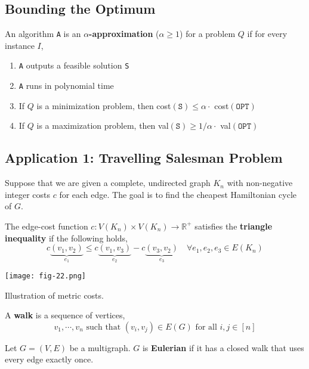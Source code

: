 \subsection{Bounding the Optimum}

\begin{defn}
	An algorithm \texttt{A} is an \textbf{$\alpha$-approximation} ($\alpha \geq 1$) for a problem $Q$ if for every instance $I$,
	\begin{enumerate}
		\item \texttt{A} outputs a feasible solution \texttt{S}
		\item \texttt{A} runs in polynomial time
		\item If $Q$ is a minimization problem, then cost$(\texttt{S}) \leq \alpha \cdot $ cost$(\texttt{OPT})$
		\item If $Q$ is a maximization problem, then val$(\texttt{S}) \geq 1/\alpha \cdot $ val$(\texttt{OPT})$
	\end{enumerate}
\end{defn}

\subsection{Application 1: Travelling Salesman Problem}
Suppose that we are given a complete, undirected graph $K_n$ with non-negative integer costs $c$ for each edge. The goal is to find the cheapest Hamiltonian cycle of $G$.

\begin{defn}
	The edge-cost function $c: V(K_n) \times V(K_n) \rightarrow \mathbb{R}^+$ satisfies the \textbf{triangle inequality} if the following holds,
	\[c\underbrace{(v_1, v_2)}_{e_1} \leq c\underbrace{(v_1, v_3)}_{e_2} - c\underbrace{(v_3, v_2)}_{e_3} \quad \forall e_1, e_2, e_3 \in E(K_n)\]
\end{defn}

\begin{marginfigure}
	\texttt{[image: fig-22.png]}
	\caption{Illustration of metric costs.}
\end{marginfigure}

\begin{defn}[Walk]
	A \textbf{walk} is a sequence of vertices,
	\[v_1, \cdots, v_n \text{ such that } (v_i, v_j) \in E(G) \text{ for all $i,j \in [n]$}\]
\end{defn}

\begin{defn}
	Let $G = (V, E)$ be a multigraph. $G$ is \textbf{Eulerian} if it has a closed walk that uses every edge exactly once.
\end{defn}

